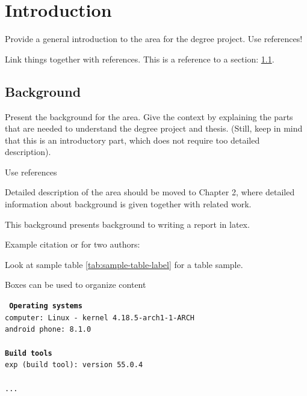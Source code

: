 \section{Introduction}

Provide a general introduction to the area for the degree project. Use references!

Link things together with references. This is a reference to a section: \ref{sec:background}.

\subsection{Background}
\label{sec:background}
Present the background for the area. Give the context by explaining the parts that are needed to understand the degree project and thesis. (Still, keep in mind that this is an introductory part, which does not require too detailed description).

Use references

Detailed description of the area should be moved to Chapter 2, where detailed information about background is given together with related work. 

This background presents background to writing a report in latex.


Example citation \cite{Jones2017} or for two authors: \cite{Jones2017, Liu2017}

Look at sample table \ref{tab:sample-table-label} for a table sample.



Boxes can be used to organize content

\begin{tcolorbox}[title={Development environment for prototype}]
	\tt{
		\textbf{Operating systems }\\
		computer: Linux - kernel 4.18.5-arch1-1-ARCH\\
		android phone: 8.1.0\\
		~\\
		\textbf{Build tools}\\
		exp (build tool): version 55.0.4\\
		~\\
		...
	}
\end{tcolorbox}



